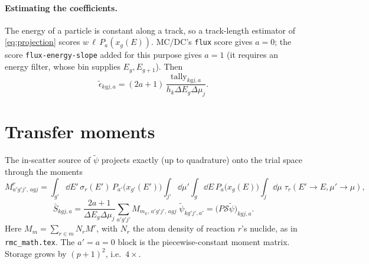 \documentclass[11pt]{article}
\newcommand{\tpsi}{\tilde\psi}
\newcommand{\teps}{\tilde\epsilon}
\newcommand{\Sbar}{\bar S}
\begin{document}
\paragraph{Estimating the coefficients.} The energy of a particle is constant along a
track, so a track-length estimator of \eqref{eq:projection} scores
$w\,\ell\,P_a(x_g(E))$. MC/DC's \texttt{flux} score gives $a=0$; the score
\texttt{flux-energy-slope} added for this purpose gives $a=1$ (it requires an
energy filter, whose bin supplies $E_g, E_{g+1}$). Then
\begin{equation}
  \teps_{kgj,a} = (2a+1)\,\frac{\text{tally}_{kgj,a}}{h_k\Delta E_g\Delta\mu_j}.
\end{equation}

\section{Transfer moments}

The in-scatter source of $\tpsi$ projects exactly (up to quadrature) onto the trial
space through the moments
\begin{equation}
  M^r_{a'g'j',\,agj} = \int_{g'}\!\dd E'\,\sigma_r(E')\,P_{a'}\big(x_{g'}(E')\big)
  \int_{j'}\!\dd\mu'\int_g\!\dd E\,P_a\big(x_g(E)\big)\int_j\!\dd\mu\;
  \tau_r(E'\!\to E,\mu'\!\to\mu),
  \label{eq:moments}
\end{equation}
\begin{equation}
  \Sbar_{kgj,a} = \frac{2a+1}{\Delta E_g\Delta\mu_j}
  \sum_{a'g'j'} M_{m_k,\,a'g'j',\,agj}\;\tpsi_{kg'j',a'} = \big(P\mathcal S\tpsi\big)_{kgj,a}.
\end{equation}
Here $M_m=\sum_{r\in m}N_rM^r$, with $N_r$ the atom density of reaction $r$'s
nuclide, as in \texttt{rmc\_math.tex}.
The $a'=a=0$ block is the piecewise-constant moment matrix. Storage grows by
$(p+1)^2$, i.e.\ $4\times$.
\end{document}
